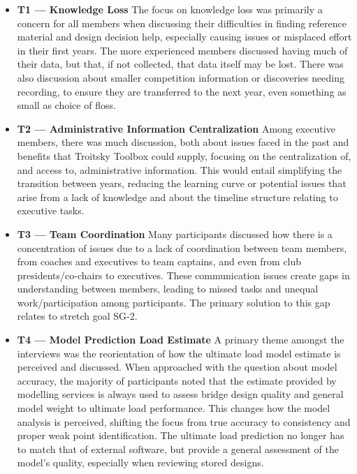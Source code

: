 \documentclass{article}
\begin{document}
\begin{itemize}

      \item \textbf{T1 --- Knowledge Loss} \newline 
      The focus on knowledge loss was primarily a concern for all members when discussing their difficulties 
      in finding reference material and design decision help, especially causing issues or misplaced effort 
      in their first years. The more experienced members discussed having much of their data, but that, if not collected, 
      that data itself may be lost. There was also discussion about smaller competition information or discoveries 
      needing recording, to ensure they are transferred to the next year, even something as small as choice of floss.

      \item \textbf{T2 --- Administrative Information Centralization} \newline
      Among executive members, there was much discussion, both about issues faced in the past and benefits that 
      Troitsky Toolbox could supply, focusing on the centralization of, and access to, administrative information. 
      This would entail simplifying the transition between years, reducing the learning curve or potential issues that arise 
      from a lack of knowledge and about the timeline structure relating to executive tasks.

      \item \textbf{T3 --- Team Coordination} \newline 
      Many participants discussed how there is a concentration of issues due to a lack of coordination between team members, from 
      coaches and executives to team captains, and even from club presidents/co-chairs to executives. These communication 
      issues create gaps in understanding between members, leading to missed tasks and unequal work/participation among participants. 
      The primary solution to this gap relates to stretch goal SG-2.

      \item \textbf{T4 --- Model Prediction Load Estimate} \newline
      A primary theme amongst the interviews was the reorientation of how the ultimate load model estimate is perceived and discussed. 
      When approached with the question about model accuracy, the majority of participants noted that the estimate provided by modelling services 
      is always used to assess bridge design quality and general model weight to ultimate load performance. This changes how the model 
      analysis is perceived, shifting the focus from true accuracy to consistency and proper weak point identification. The ultimate load 
      prediction no longer has to match that of external software, but provide a general assessment of the model's quality, especially when 
      reviewing stored designs.


\end{itemize}
\end{document}
